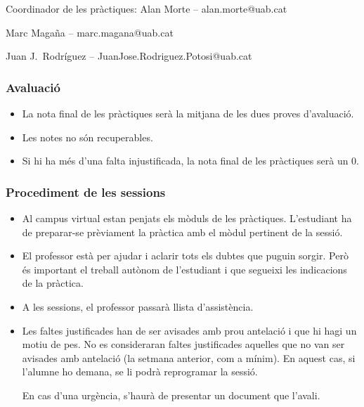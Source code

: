 \documentclass[11pt,a4paper]{article}
\begin{document}
\vspace{1em}

\noindent
Coordinador de les pràctiques: Alan Morte -- {alan.morte@uab.cat}

\noindent
Marc Magaña -- marc.magana@uab.cat

\noindent
Juan J.~Rodríguez -- {JuanJose.Rodriguez.Potosi@uab.cat
}


\subsubsection*{Avaluació}

\begin{itemize}
    \item La nota final de les pràctiques serà la mitjana de les dues proves d'avaluació.

    \item Les notes no són recuperables.

    \item Si hi ha més d'una falta injustificada, la nota final de les pràctiques serà un 0.
\end{itemize}

\subsubsection*{Procediment de les sessions}

\begin{itemize}
    \item Al campus virtual estan penjats els mòduls de les pràctiques. L'estudiant ha de preparar-se prèviament la pràctica amb el mòdul pertinent de la sessió.

    \item El professor està per ajudar i aclarir tots els dubtes que puguin sorgir. Però és important el treball autònom de l'estudiant i que segueixi les indicacions de la pràctica.

    \item A les sessions, el professor passarà llista d'assistència.

    \item Les faltes justificades han de ser avisades amb prou antelació i que hi hagi un motiu de pes. No es consideraran faltes justificades aquelles que no van ser avisades amb antelació (la setmana anterior, com a mínim). En aquest cas, si l'alumne ho demana, se li podrà reprogramar la sessió.

    En cas d'una urgència, s'haurà de presentar un document que l'avali.
\end{itemize}
\end{document}
